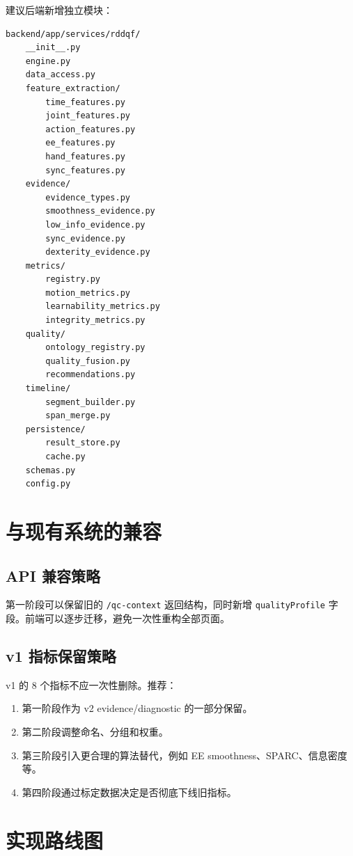 \documentclass[UTF8,zihao=-4,oneside,openany]{ctexrep}
\newcommand{\Code}[1]{\texttt{#1}}
\begin{document}
建议后端新增独立模块：

\begin{verbatim}
backend/app/services/rddqf/
    __init__.py
    engine.py
    data_access.py
    feature_extraction/
        time_features.py
        joint_features.py
        action_features.py
        ee_features.py
        hand_features.py
        sync_features.py
    evidence/
        evidence_types.py
        smoothness_evidence.py
        low_info_evidence.py
        sync_evidence.py
        dexterity_evidence.py
    metrics/
        registry.py
        motion_metrics.py
        learnability_metrics.py
        integrity_metrics.py
    quality/
        ontology_registry.py
        quality_fusion.py
        recommendations.py
    timeline/
        segment_builder.py
        span_merge.py
    persistence/
        result_store.py
        cache.py
    schemas.py
    config.py
\end{verbatim}

\section{与现有系统的兼容}

\subsection{API 兼容策略}

第一阶段可以保留旧的 \Code{/qc-context} 返回结构，同时新增 \Code{qualityProfile} 字段。前端可以逐步迁移，避免一次性重构全部页面。

\subsection{v1 指标保留策略}

v1 的 8 个指标不应一次性删除。推荐：

\begin{enumerate}
\item 第一阶段作为 v2 evidence/diagnostic 的一部分保留。
\item 第二阶段调整命名、分组和权重。
\item 第三阶段引入更合理的算法替代，例如 EE smoothness、SPARC、信息密度等。
\item 第四阶段通过标定数据决定是否彻底下线旧指标。
\end{enumerate}

\section{实现路线图}
\end{document}
